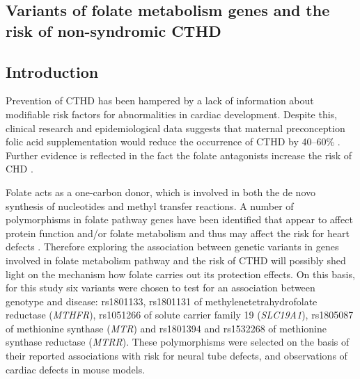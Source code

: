 \begin{refsection}

\chapter{Variants of folate metabolism genes and the risk of non-syndromic CTHD} %

\label{Chapter6} %


\section{Introduction}

Prevention of CTHD has been hampered by a lack of information about modifiable risk factors for abnormalities in cardiac development. Despite this, clinical research and epidemiological data suggests that maternal preconception folic acid supplementation would reduce the occurrence of CTHD by 40–60\% \cite{smedts2008maternal,rosenquist1996homocysteine,botto2003multivitamin,boot2004cardiac}. Further evidence is reflected in the fact the folate antagonists increase the risk of CHD \cite{bailey2005folic}. 

Folate acts as a one-carbon donor, which is involved in both the de novo synthesis of nucleotides and methyl transfer reactions. A number of polymorphisms in folate pathway genes have been identified that appear to affect protein function and/or folate metabolism and thus may affect the risk for heart defects \cite{bailey2009folate}. Therefore exploring the association between genetic variants in genes involved in folate metabolism pathway and the risk of CTHD will possibly shed light on the mechanism how folate carries out its protection effects. On this basis, for this study six variants were chosen to test for an association between genotype and disease: rs1801133, rs1801131 of methylenetetrahydrofolate reductase (\textit{MTHFR}), rs1051266 of solute carrier family 19 (\textit{SLC19A1}), rs1805087 of methionine synthase (\textit{MTR}) and rs1801394 and rs1532268 of methionine synthase reductase (\textit{MTRR}). These polymorphisms were selected on the basis of their reported associations with risk for neural tube defects, and observations of cardiac defects in mouse models.


\end{refsection}
